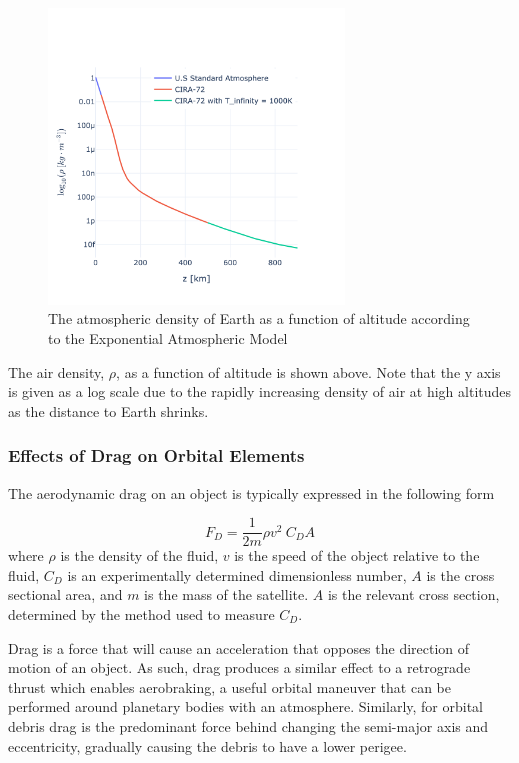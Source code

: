 \documentclass[a4paper, 12pt]{article}
\begin{document}
\begin{figure}[h]
	\centering     %
	\includegraphics[width=0.7\textwidth]{Atmospheric_Density_v_Altitude}
	\caption{The atmospheric density of Earth as a function of altitude according to the Exponential Atmospheric Model}
\end{figure}

The air density, $\rho$, as a function of altitude is shown above. Note that the y axis is given as a log scale due to the rapidly increasing density of air at high altitudes as the distance to Earth shrinks.

\subsubsection{Effects of Drag on Orbital Elements}

The aerodynamic drag on an object is typically expressed in the following form

\begin{equation}
	F_D = \frac{1}{2m} \rho v^2 \: C_D A
\end{equation}
where $\rho$ is the density of the fluid, $v$ is the speed of the object relative to the fluid, $C_D$ is an experimentally determined dimensionless number, $A$ is the cross sectional area, and $m$ is the mass of the satellite. $A$ is the relevant cross section, determined by the method used to measure $C_D$. 

Drag is a force that will cause an acceleration that opposes the direction of motion of an object. As such, drag produces a similar effect to a retrograde thrust which enables aerobraking, a useful orbital maneuver that can be performed around planetary bodies with an atmosphere. Similarly, for orbital debris drag is the predominant force behind changing the semi-major axis and eccentricity, gradually causing the debris to have a lower perigee. 
\end{document}
